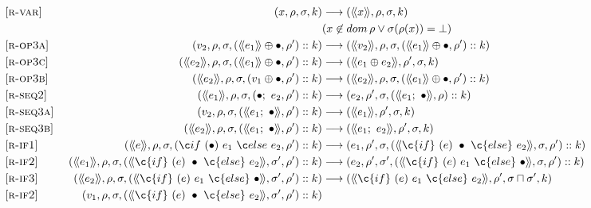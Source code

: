\begin{figure*}
  \begin{center}
\begin{align*}
  \omit [\textsc{r-var}] &&
    (x, \rho, \sigma, k)
    & \longrightarrow
    (\residual{x}, \rho, \sigma, k)
        \\ &&& (x \not\in \mathop{dom} \rho \vee \sigma(\rho(x)) = \bot)
\\
  \omit [\textsc{r-op3a}] &&
    (v_2, \rho, \sigma, (\residual{e_1} \oplus \bullet,\rho')::k)
    & \longrightarrow
    (\residual{v_2}, \rho, \sigma, (\residual{e_1} \oplus \bullet,\rho')::k)
\\
  \omit [\textsc{r-op3c}] &&
    (\residual{e_2}, \rho, \sigma, (\residual{e_1} \oplus \bullet,\rho')::k)
    & \longrightarrow
    (\residual{e_1 \oplus e_2}, \rho', \sigma, k)
\\
  \omit [\textsc{r-op3b}] &&
    (\residual{e_2}, \rho, \sigma, (v_1 \oplus \bullet,\rho')::k)
    & \longrightarrow
    (\residual{e_2}, \rho, \sigma, (\residual{e_1} \oplus \bullet,\rho')::k)
\\
  \omit [\textsc{r-seq2}] &&
    (\residual{e_1}, \rho, \sigma, \then{e_2}{\rho'}::k)
    & \longrightarrow
    (e_2, \rho', \sigma, (\residual{e_1;~\bullet}, \rho)::k)
\\
  \omit [\textsc{r-seq3a}] &&
    (v_2, \rho, \sigma, (\residual{e_1;~\bullet}, \rho')::k)
    & \longrightarrow
    (\residual{e_1}, \rho', \sigma, k)
\\
  \omit [\textsc{r-seq3b}] &&
    (\residual{e_2}, \rho, \sigma, (\residual{e_1;~\bullet}, \rho')::k)
    & \longrightarrow
    (\residual{e_1;~e_2}, \rho', \sigma, k)
\\
  \omit [\textsc{r-if1}] &&
    (\residual{e}, \rho, \sigma, \branch{e_1}{e_2}{\rho'}::k)
    & \longrightarrow
    (e_1, \rho', \sigma, (\residual{\c{if}~(e)~\bullet~\c{else}~e_2}, \sigma, \rho')::k)
\\
  \omit [\textsc{r-if2}] &&
    (\residual{e_1}, \rho, \sigma, (\residual{\c{if}~(e)~\bullet~\c{else}~e_2}, \sigma', \rho')::k)
    & \longrightarrow
    (e_2, \rho', \sigma', (\residual{\c{if}~(e)~e_1~\c{else}~\bullet}, \sigma, \rho')::k)
\\
  \omit [\textsc{r-if3}] &&
    (\residual{e_2}, \rho, \sigma, (\residual{\c{if}~(e)~e_1~\c{else}~\bullet}, \sigma', \rho')::k)
    & \longrightarrow
    (\residual{\c{if}~(e)~e_1~\c{else}~e_2}, \rho', \sigma \sqcap \sigma', k)
\\
  \omit [\textsc{r-if2}] &&
    (v_1, \rho, \sigma, (\residual{\c{if}~(e)~\bullet~\c{else}~e_2}, \sigma', \rho')::k)

\end{align*}
\end{center}
\end{figure*}
